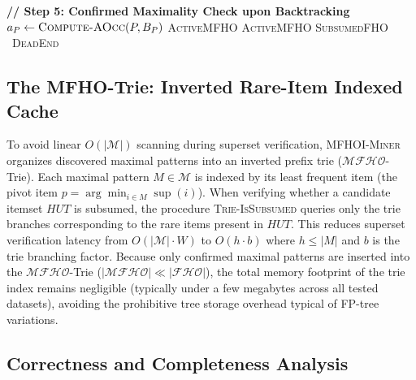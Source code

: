 \documentclass[runningheads,orivec]{llncs}
\newcommand{\supp}{\operatorname{sup}}
\newcommand{\FHO}{\ensuremath{\mathcal{FHO}}}
\newcommand{\MFHO}{\ensuremath{\mathcal{MFHO}}}
\newcommand{\MFHOI}{\ensuremath{\mathcal{MFHO}}}
\newcommand{\MFHOIMiner}{\textsc{MFHOI-Miner}}
\begin{document}
\begin{algorithm}[htbp]
\begin{algorithmic}[1]
\State \textbf{// Step 5: Confirmed Maximality Check upon Backtracking}
\State $a_P \gets \Call{Compute-AOcc}{P, B_P}$
    \State {} 
    \State \Return \textsc{ActiveMFHO}
\EndIf
{} \Return \textsc{ActiveMFHO}
 \Return \textsc{SubsumedFHO}
\Else \ \Return \textsc{DeadEnd} \EndIf
\end{algorithmic}
\end{algorithm}

\subsection{The MFHO-Trie: Inverted Rare-Item Indexed Cache}

To avoid linear $O(|\mathcal{M}|)$ scanning during superset verification, \MFHOIMiner{} organizes discovered maximal patterns into an inverted prefix trie (\MFHO{}-Trie). Each maximal pattern $M \in \mathcal{M}$ is indexed by its least frequent item (the pivot item $p = \arg\min_{i \in M} \supp(i)$). 
When verifying whether a candidate itemset $HUT$ is subsumed, the procedure \textsc{Trie-IsSubsumed} queries only the trie branches corresponding to the rare items present in $HUT$. This reduces superset verification latency from $O(|\mathcal{M}| \cdot W)$ to $O(h \cdot b)$ where $h \le |M|$ and $b$ is the trie branching factor.
Because only confirmed maximal patterns are inserted into the \MFHO{}-Trie ($|\MFHOI| \ll |\FHO|$), the total memory footprint of the trie index remains negligible (typically under a few megabytes across all tested datasets), avoiding the prohibitive tree storage overhead typical of FP-tree variations.

\subsection{Correctness and Completeness Analysis}
\end{document}
